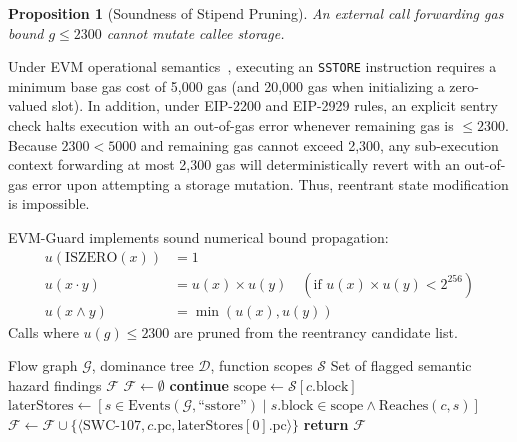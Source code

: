 \documentclass[conference]{IEEEtran}
\newtheorem{prop}{Proposition}
\newenvironment{proposition}[1][]{\begin{prop}[#1]\upshape}{\end{prop}}
\begin{document}
\begin{proposition}[Soundness of Stipend Pruning]
An external call forwarding gas bound $g \le 2300$ cannot mutate callee storage.
\end{proposition}
\begin{IEEEproof}
Under EVM operational semantics~\cite{wood2014ethereum}, executing an \texttt{SSTORE} instruction requires a minimum base gas cost of 5,000 gas (and 20,000 gas when initializing a zero-valued slot). In addition, under EIP-2200 and EIP-2929 rules, an explicit sentry check halts execution with an out-of-gas error whenever remaining gas is $\le 2300$. Because $2300 < 5000$ and remaining gas cannot exceed 2,300, any sub-execution context forwarding at most 2,300 gas will deterministically revert with an out-of-gas error upon attempting a storage mutation. Thus, reentrant state modification is impossible.
\end{IEEEproof}

EVM-Guard implements sound numerical bound propagation:
\begin{align}
u(\mathrm{ISZERO}(x)) &= 1 \\
u(x \cdot y) &= u(x) \times u(y) \quad (\text{if } u(x) \times u(y) < 2^{256}) \\
u(x \land y) &= \min(u(x), u(y))
\end{align}
Calls where $u(g) \le 2300$ are pruned from the reentrancy candidate list.

\begin{algorithm}[t]
\caption{Dominator-Based Reentrancy and Hazard Checking}
\label{alg:hazard}
\begin{algorithmic}[1]
\REQUIRE Flow graph $\mathcal{G}$, dominance tree $\mathcal{D}$, function scopes $\mathcal{S}$
\ENSURE Set of flagged semantic hazard findings $\mathcal{F}$
\STATE $\mathcal{F} \leftarrow \emptyset$
        \STATE \textbf{continue}
    \ENDIF
    \STATE $\mathrm{scope} \leftarrow \mathcal{S}[c.\mathrm{block}]$
    \STATE $\mathrm{laterStores} \leftarrow [s \in \mathrm{Events}(\mathcal{G}, \text{``sstore''}) \mid s.\mathrm{block} \in \mathrm{scope} \land \mathrm{Reaches}(c, s)]$
        \STATE $\mathcal{F} \leftarrow \mathcal{F} \cup \{\langle \text{SWC-107}, c.\mathrm{pc}, \mathrm{laterStores}[0].\mathrm{pc} \rangle\}$
    \ENDIF
\ENDFOR
\STATE \textbf{return} $\mathcal{F}$
\end{algorithmic}
\end{algorithm}
\end{document}
